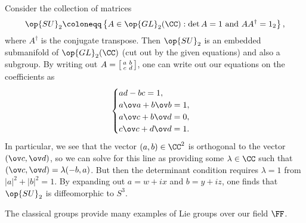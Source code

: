 \documentclass[../notes.tex]{subfiles}
\begin{document}
\begin{example}
	Consider the collection of matrices
	\[{\op{SU}_2}\coloneqq\left\{A\in\op{GL}_2(\CC):\det A=1\text{ and }AA^\dagger=1_2\right\},\]
	where $A^\dagger$ is the conjugate transpose. Then $\op{SU}_2$ is an embedded submanifold of $\op{GL}_2(\CC)$ (cut out by the given equations) and also a subgroup. By writing out $A=\begin{bsmallmatrix}
		a & b \\ c & d
	\end{bsmallmatrix}$, one can write out our equations on the coefficients as
	\[\begin{cases}
		ad-bc=1, \\
		a\ov a+b\ov b=1, \\
		a\ov c+b\ov d=0, \\
		c\ov c+d\ov d=1.
	\end{cases}\]
	In particular, we see that the vector $(a,b)\in\CC^2$ is orthogonal to the vector $(\ov c,\ov d)$, so we can solve for this line as providing some $\lambda\in\CC$ such that $(\ov c,\ov d)=\lambda(-b,a)$. But then the determinant condition requires $\lambda=1$ from $\left|a\right|^2+\left|b\right|^2=1$. By expanding out $a=w+ix$ and $b=y+iz$, one finds that $\op{SU}_2$ is diffeomorphic to $S^3$.
\end{example}
The classical groups provide many examples of Lie groups over our field $\FF$.
\end{document}
